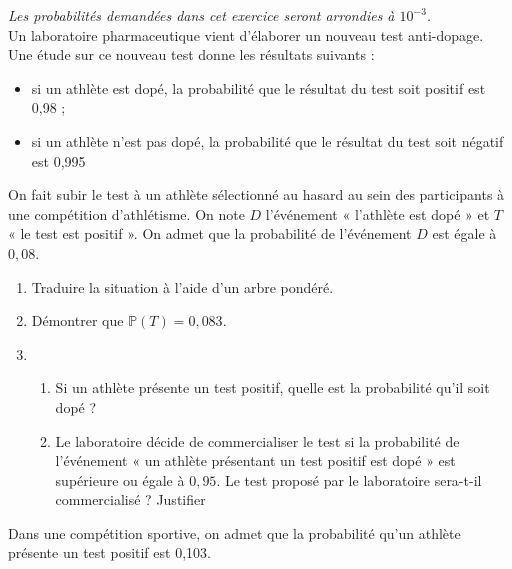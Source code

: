 \documentclass[11pt,fleqn, openany]{book} %
\begin{document}
\begin{exercise}[subtitle={(Amérique du Nord 2021)}]

\textit{Les probabilités demandées dans cet exercice seront arrondies à $10^{-3}$.}\\
Un laboratoire pharmaceutique vient d'élaborer un nouveau test anti-dopage. Une étude sur ce nouveau test donne les résultats suivants :
\begin{itemize}
\item  si un athlète est dopé, la probabilité que le résultat du test soit positif est 0,98 ;
\item si un athlète n'est pas dopé, la probabilité que le résultat du test soit négatif est 0,995
\end{itemize}
On fait subir le test à un athlète sélectionné au hasard au sein des participants à une compétition d'athlétisme. On note $D$ l'événement « l'athlète est dopé » et $T$  « le test est positif ». On admet que la probabilité de
l'événement $D$ est égale à $0,08$.

\begin{enumerate}
\item Traduire la situation à l'aide d'un arbre pondéré.
\item Démontrer que $\mathbb{P}(T)=0,083$.
\item \begin{enumerate}
\item Si un athlète présente un test positif, quelle est la probabilité qu'il soit dopé ?
\item Le laboratoire décide de commercialiser le test si la probabilité de l'événement « un athlète présentant un test positif est dopé » est supérieure ou égale à $0,95$. Le test proposé par le laboratoire sera-t-il commercialisé ? Justifier
\end{enumerate}
\end{enumerate}

Dans une compétition sportive, on admet que la probabilité qu'un athlète présente un test positif est 0,103.


\end{exercise}
\end{document}
